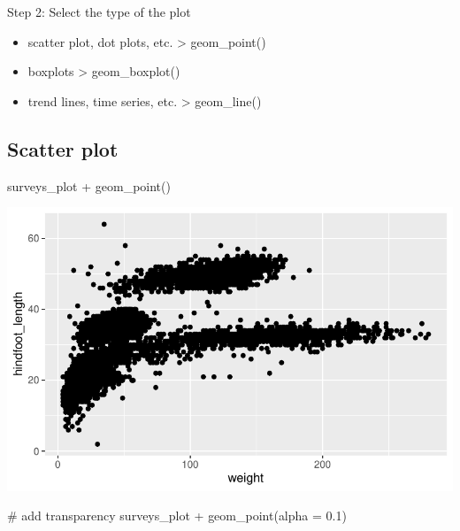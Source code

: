 \documentclass[
  letterpaper,
  DIV=11,
  numbers=noendperiod]{scrreprt}
\newenvironment{Shaded}{\begin{snugshade}}{\end{snugshade}}
\newcommand{\AttributeTok}[1]{\textcolor[rgb]{0.40,0.45,0.13}{#1}}
\newcommand{\CommentTok}[1]{\textcolor[rgb]{0.37,0.37,0.37}{#1}}
\newcommand{\FloatTok}[1]{\textcolor[rgb]{0.68,0.00,0.00}{#1}}
\newcommand{\FunctionTok}[1]{\textcolor[rgb]{0.28,0.35,0.67}{#1}}
\newcommand{\NormalTok}[1]{\textcolor[rgb]{0.00,0.23,0.31}{#1}}
\newcommand{\SpecialCharTok}[1]{\textcolor[rgb]{0.37,0.37,0.37}{#1}}
\providecommand{\tightlist}{%
  \setlength{\itemsep}{0pt}\setlength{\parskip}{0pt}}\usepackage{longtable,booktabs,array}
\begin{document}
Step 2: Select the type of the plot

\begin{itemize}
\tightlist
\item
  scatter plot, dot plots, etc. \textgreater{} geom\_point()
\item
  boxplots \textgreater{} geom\_boxplot()
\item
  trend lines, time series, etc. \textgreater{} geom\_line()
\end{itemize}

\subsection{Scatter plot}\label{scatter-plot}

\begin{Shaded}
\begin{Highlighting}[]
\NormalTok{surveys\_plot }\SpecialCharTok{+} \FunctionTok{geom\_point}\NormalTok{()}
\end{Highlighting}
\end{Shaded}

\includegraphics{src/notebooks/r_files/figure-pdf/unnamed-chunk-49-1.pdf}

\begin{Shaded}
\begin{Highlighting}[]
\CommentTok{\# add transparency}
\NormalTok{surveys\_plot }\SpecialCharTok{+} \FunctionTok{geom\_point}\NormalTok{(}\AttributeTok{alpha =} \FloatTok{0.1}\NormalTok{)}
\end{Highlighting}
\end{Shaded}
\end{document}
